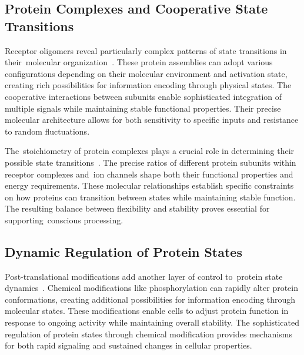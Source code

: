 \subsection*{Protein Complexes and Cooperative State Transitions~}

Receptor oligomers reveal particularly complex patterns of state transitions in their~molecular organization~\cite{Nussinov2013, Sudhof2018}. These protein assemblies can adopt various configurations depending on their molecular environment and activation state, creating rich possibilities for information encoding through physical states. The cooperative interactions between subunits enable sophisticated integration of multiple signals while maintaining stable functional properties. Their precise molecular architecture allows for both sensitivity to specific inputs and resistance to random fluctuations.

The~stoichiometry of protein complexes plays a crucial role in determining their possible state transitions~\cite{Brangwynne2015, Hyman2014}. The precise ratios of different protein subunits within receptor complexes and~ion channels shape both their functional properties and energy requirements. These molecular relationships establish specific constraints on how proteins can transition between states while maintaining stable function. The resulting balance between flexibility and stability proves essential for supporting~conscious processing.

\subsection*{Dynamic Regulation of Protein States~}

Post-translational modifications add another layer of control to~protein state dynamics~\cite{gershman2023molecular, Davis2018}. Chemical modifications like phosphorylation can rapidly alter protein conformations, creating additional possibilities for information encoding through molecular states. These modifications enable cells to adjust protein function in response to ongoing activity while maintaining overall stability. The sophisticated regulation of protein states through chemical modification provides mechanisms for both rapid signaling and sustained changes in cellular properties.

